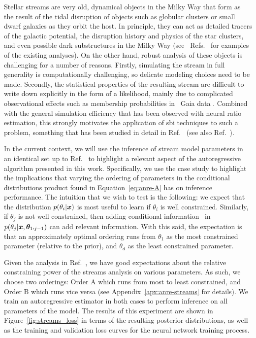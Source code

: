  Stellar streams are very old, dynamical objects in the Milky Way that form as the result of the tidal disruption of objects such as globular clusters or small dwarf galaxies as they orbit the host. In principle, they can act as detailed tracers of the galactic potential, the disruption history and physics of the star clusters, and even possible dark substructures in the Milky Way (see \eg~Refs.~\cite{Erkal:2015kqa,Banik:2018pjp,Banik:2018pal,Koposov:2009hn,Bonaca:2014qia,Amorisco:2016evb,Bovy:2016chl,Malhan:2022nfe} for examples of the existing analyses). On the other hand, robust analysis of these objects is challenging for a number of reasons. Firstly, simulating the stream in full generality is computationally challenging, so delicate modeling choices need to be made. Secondly, the statistical properties of the resulting stream are difficult to write down explicitly in the form of a likelihood, mainly due to complicated observational effects such as membership probabilities in \eg~Gaia data \cite{Gaia:2018ydn,Gaia:2021aa}. Combined with the general simulation efficiency that has been observed with neural ratio estimation, this strongly motivates the application of \gls*{sbi} techniques to such a problem, something that has been studied in detail in Ref.~\cite{Alvey:2023pkx} (see also Ref.~\cite{Hermans:2020skz}).

In the current context, we will use the inference of stream model parameters in an identical set up to Ref.~\cite{Alvey:2023pkx} to highlight a relevant aspect of the autoregressive algorithm presented in this work. Specifically, we use the case study to highlight the implications that varying the ordering of parameters in the conditional distributions product found in Equation~\eqref{eq:anre-A} has on inference performance. The intuition that we wish to test is the following: we expect that the distribution $p(\theta_i | \bm{x})$ is most useful to learn if $\theta_i$ is well constrained. Similarly, if $\theta_j$ is not well constrained, then adding conditional information \eg~in $p(\theta_j | \bm{x}, \bm{\theta}_{1:j-1})$ can add relevant information. With this said, the expectation is that an approximately optimal ordering runs from $\theta_1$ as the most constrained parameter (relative to the prior), and $\theta_d$ as the least constrained parameter.

Given the analysis in Ref.~\cite{Alvey:2023pkx}, we have good expectations about the relative constraining power of the streams analysis on various parameters. As such, we choose two orderings: Order A which runs from most to least constrained, and Order B which runs vice versa (see Appendix~\ref{apx:anre-streams} for details). We train an autoregressive estimator in both cases to perform inference on all parameters of the model. The results of this experiment are shown in Figure~\ref{fig:streams_loss} in terms of the resulting posterior distributions, as well as the training and validation loss curves for the neural network training process. 

